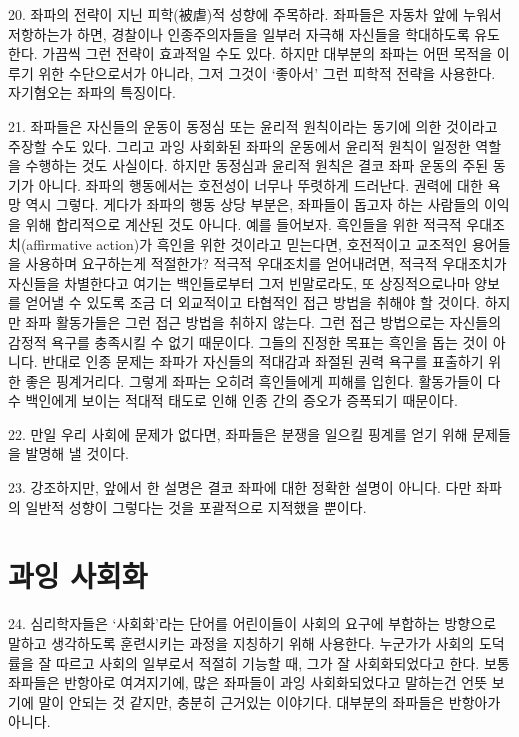 \documentclass[11pt,a4paper]{article}
\begin{document}
\begin{multicols}{2}
20. 좌파의 전략이 지닌 피학(被虐)적 성향에 주목하라. 좌파들은 자동차 앞에 누워서 저항하는가 하면,  경찰이나 인종주의자들을 일부러 자극해 자신들을 학대하도록 유도한다. 가끔씩 그런 전략이 효과적일 
수도 있다. 하지만 대부분의 좌파는 어떤 목적을 이루기 위한 수단으로서가 아니라, 그저 그것이 `좋아서' 그런 피학적 전략을 사용한다. 자기혐오는 좌파의 특징이다. 


21. 좌파들은 자신들의 운동이 동정심 또는 윤리적 원칙이라는 동기에 의한 것이라고 주장할 수도 있다.  그리고 과잉 사회화된 좌파의 운동에서 윤리적 원칙이 일정한 역할을 수행하는 것도 사실이다. 하지만  동정심과 윤리적 원칙은 결코 좌파 운동의 주된 동기가 아니다. 좌파의 행동에서는 호전성이 너무나  뚜렷하게 드러난다. 권력에 대한 욕망 역시 그렇다. 게다가 좌파의 행동 상당 부분은, 좌파들이 돕고자  하는 사람들의 이익을 위해 합리적으로 계산된 것도 아니다. 예를 들어보자. 흑인들을 위한 적극적  우대조치(affirmative action)가 흑인을 위한 것이라고 믿는다면, 호전적이고 교조적인 용어들을  사용하며 요구하는게 적절한가? 적극적 우대조치를 얻어내려면, 적극적 우대조치가 자신들을 차별한다고 여기는 백인들로부터 그저 빈말로라도, 또 상징적으로나마 양보를 얻어낼 수 있도록 조금 더 외교적이고  타협적인 접근 방법을 취해야 할 것이다. 하지만 좌파 활동가들은 그런 접근 방법을 취하지 않는다. 그런  접근 방법으로는 자신들의 감정적 욕구를 충족시킬 수 없기 때문이다. 그들의 진정한 목표는 흑인을 돕는  것이 아니다. 반대로 인종 문제는 좌파가 자신들의 적대감과 좌절된 권력 욕구를 표출하기 위한 좋은  핑계거리다. 그렇게 좌파는 오히려 흑인들에게 피해를 입힌다. 활동가들이 다수 백인에게 보이는 적대적  태도로 인해 인종 간의 증오가 증폭되기 때문이다. 


22. 만일 우리 사회에 문제가 없다면, 좌파들은 분쟁을 일으킬 핑계를 얻기 위해 문제들을 발명해 낼 것이다. 


23. 강조하지만, 앞에서 한 설명은 결코 좌파에 대한 정확한 설명이 아니다. 다만 좌파의 일반적 성향이  그렇다는 것을 포괄적으로 지적했을 뿐이다. 


\section*{과잉 사회화} 
24. 심리학자들은 `사회화'라는 단어를 어린이들이 사회의 요구에 부합하는 방향으로 말하고 생각하도록  훈련시키는 과정을 지칭하기 위해 사용한다. 누군가가 사회의 도덕률을 잘 따르고 사회의 일부로서  적절히 기능할 때, 그가 잘 사회화되었다고 한다. 보통 좌파들은 반항아로 여겨지기에, 많은 좌파들이  과잉 사회화되었다고 말하는건 언뜻 보기에 말이 안되는 것 같지만, 충분히 근거있는 이야기다. 대부분의  좌파들은 반항아가 아니다. 



\end{multicols}
\end{document}
